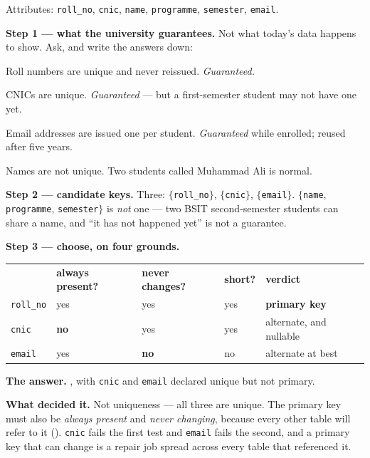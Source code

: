 \begin{worked}
Attributes: \texttt{roll\_no}, \texttt{cnic}, \texttt{name},
\texttt{programme}, \texttt{semester}, \texttt{email}.

\medskip
\textbf{Step 1 --- what the university guarantees.} Not what today's data
happens to show. Ask, and write the answers down:
\begin{tight}
  \item Roll numbers are unique and never reissued. \emph{Guaranteed.}
  \item CNICs are unique. \emph{Guaranteed} --- but a first-semester student
        may not have one yet.
  \item Email addresses are issued one per student. \emph{Guaranteed} while
        enrolled; reused after five years.
  \item Names are not unique. Two students called Muhammad Ali is normal.
\end{tight}

\textbf{Step 2 --- candidate keys.} Three:
$\{$\texttt{roll\_no}$\}$, $\{$\texttt{cnic}$\}$, $\{$\texttt{email}$\}$.
$\{$\texttt{name}, \texttt{programme}, \texttt{semester}$\}$ is \emph{not} one
--- two BSIT second-semester students can share a name, and ``it has not
happened yet'' is not a guarantee.

\medskip
\textbf{Step 3 --- choose, on four grounds.}

\smallskip
\begin{tabular}{@{}L{2.2cm}L{2.4cm}L{2.4cm}L{2.2cm}L{3.0cm}@{}}
& \textbf{always present?} & \textbf{never changes?} & \textbf{short?}
& \textbf{verdict} \\
\texttt{roll\_no} & yes & yes & yes & \textbf{primary key} \\
\texttt{cnic}     & \textbf{no} & yes & yes & alternate, and nullable \\
\texttt{email}    & yes & \textbf{no} & no & alternate at best \\
\end{tabular}

\medskip
\textbf{The answer.} , with \texttt{cnic} and \texttt{email} declared
unique but not primary.

\smallskip
\textbf{What decided it.} Not uniqueness --- all three are unique. The primary
key must also be \emph{always present} and \emph{never changing}, because
every other table will refer to it (). \texttt{cnic} fails
the first test and \texttt{email} fails the second, and a primary key that can
change is a repair job spread across every table that referenced it.
\end{worked}


